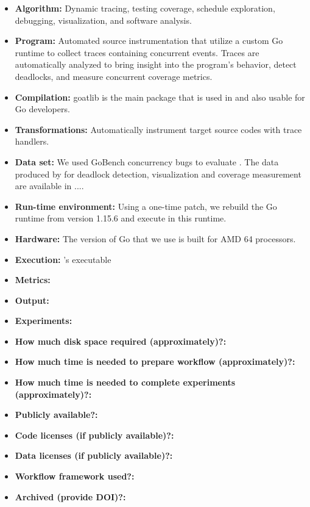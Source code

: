 {\small
\begin{itemize}
  \item {\bf Algorithm: }Dynamic tracing, testing coverage, schedule exploration, debugging, visualization, and software analysis.
  \item {\bf Program: } Automated source instrumentation that utilize a custom Go runtime to collect traces containing concurrent events. Traces are automatically analyzed to bring insight into the program's behavior, detect deadlocks, and measure concurrent coverage metrics.
  \item {\bf Compilation: } goatlib is the main package that is used in \goat and also usable for Go developers.
  \item {\bf Transformations: } Automatically instrument target source codes with \goat trace handlers.
  \item {\bf Data set: } We used GoBench \cite{yuan-gobench-cgo21} concurrency bugs to evaluate \goat. The data produced by \goat for deadlock detection, visualization and coverage measurement are available in ....
  \item {\bf Run-time environment: } Using a one-time patch, we rebuild the Go runtime from version 1.15.6 and execute \goat in this runtime.
  \item {\bf Hardware: } The version of Go that we use is built for AMD 64 processors.
  \item {\bf Execution: } \goat's executable 
  \item {\bf Metrics: }
  \item {\bf Output: }
  \item {\bf Experiments: }
  \item {\bf How much disk space required (approximately)?: }
  \item {\bf How much time is needed to prepare workflow (approximately)?: }
  \item {\bf How much time is needed to complete experiments (approximately)?: }
  \item {\bf Publicly available?: }
  \item {\bf Code licenses (if publicly available)?: }
  \item {\bf Data licenses (if publicly available)?: }
  \item {\bf Workflow framework used?: }
  \item {\bf Archived (provide DOI)?: }
\end{itemize}

}
